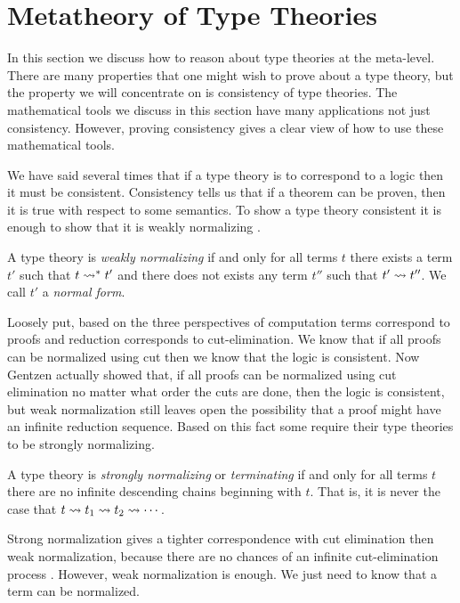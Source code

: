 \section{Metatheory of Type Theories}
\label{sec:metatheory_of_programming_languages}
In this section we discuss how to reason about type theories at the
meta-level.  There are many properties that one might wish to prove
about a type theory, but the property we will concentrate on is
consistency of type theories.  The mathematical tools we discuss in
this section have many applications not just consistency.  However,
proving consistency gives a clear view of how to use these
mathematical tools.

We have said several times that if a type theory is to correspond to a
logic then it must be consistent.  Consistency tells us that if a
theorem can be proven, then it is true with respect to some semantics.
To show a type theory consistent it is enough to show that it is
weakly normalizing \cite{Sorensen:2006}.
\begin{definition}
  \label{def:weak_norm}
  A type theory is \emph{weakly normalizing} if and only for all terms $t$
  there exists a term $t'$ such that $t \rightsquigarrow^* t'$ and there does
  not exists any term $t''$ such that $t' \rightsquigarrow t''$.  We
  call $t'$ a \emph{normal form}.
\end{definition}
\noindent
Loosely put, based on the three perspectives of computation terms
correspond to proofs and reduction corresponds to cut-elimination.  We
know that if all proofs can be normalized using cut then we know that
the logic is consistent.  Now Gentzen actually showed that, if all
proofs can be normalized using cut elimination no matter what order
the cuts are done, then the logic is consistent, but weak
normalization still leaves open the possibility that a proof might
have an infinite reduction sequence. Based on this fact some require
their type theories to be strongly normalizing.
\begin{definition}
  \label{def:strong_norm}
  A type theory is \emph{strongly normalizing} or \emph{terminating}
  if and only for all terms $t$ there are no infinite descending
  chains beginning with $t$.  That is, it is never the case that $t
  \rightsquigarrow t_1 \rightsquigarrow t_2 \rightsquigarrow \cdots$.
\end{definition}
\noindent
Strong normalization gives a tighter correspondence with cut
elimination then weak normalization, because there are no chances of
an infinite cut-elimination process \cite{Sorensen:2006}.  However,
weak normalization is enough.  We just need to know that a term can be
normalized.

